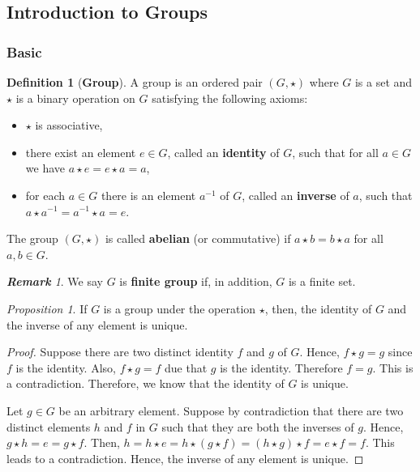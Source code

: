 \documentclass[paper=a4, fontsize=11pt]{scrartcl}
\numberwithin{equation}{section}		%
\numberwithin{figure}{section}			%
\numberwithin{table}{section}				%
\theoremstyle{definition}
\newtheorem{definition}{Definition}[section]
\theoremstyle{remark}
\newtheorem*{remark}{\textbf{Remark}}
\theoremstyle{example}
\newtheorem{prop}{Proposition}[section]
\begin{document}
\newpage
\subsection{Introduction to Groups}

\subsubsection{Basic }

\begin{definition}[\textbf{Group}]
    A group is an ordered pair $(G,\star)$ where $G$ is a set and $\star$ is a binary operation on $G$ satisfying the following axioms:
    \begin{itemize}
        \item $\star$ is associative,
        \item there exist an element $e \in G$, called an \textbf{identity} of $G$, such that for all $a \in G$ we have $a \star e = e \star a = a$,
        \item for each $a \in G$ there is an element $a^{-1}$ of $G$, called an \textbf{inverse} of $a$, such that $a \star a^{-1} = a^{-1} \star a = e$.
    \end{itemize}
    The group $(G,\star)$ is called \textbf{abelian} (or commutative) if $a \star b = b \star a$ for all $a,b \in G$.
\end{definition}

\begin{remark}
    We say $G$ is \textbf{finite group} if, in addition, $G$ is a finite set.
\end{remark}

\begin{prop}
    If $G$ is a group under the operation $\star$, then, the identity of $G$ and the inverse of any element is unique. 
\end{prop}

\begin{proof}
    Suppose there are two distinct identity $f$ and $g$ of $G$. Hence, $f\star g = g$ since $f$ is the identity. Also, $f\star g = f$ due that $g$ is the identity. Therefore $f = g$. This is a contradiction. Therefore, we know that the identity of $G$ is unique. 
    
    Let $g \in G$ be an arbitrary element. Suppose by contradiction that there are two distinct elements $h$ and $f$ in $G$ such that they are both the inverses of $g$. Hence, $g \star h = e = g \star f$. Then, $h = h \star e = h \star (g \star f) = (h \star g) \star f = e \star f = f$. This leads to a contradiction. Hence, the inverse of any element is unique.
\end{proof}
\end{document}
